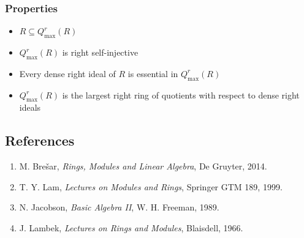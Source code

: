 \documentclass{article}
\begin{document}
	\subsubsection*{Properties}
	\begin{itemize}
		\item $R \subseteq Q^r_{\text{max}}(R)$
		\item $Q^r_{\text{max}}(R)$ is right self-injective
		\item Every dense right ideal of $R$ is essential in $Q^r_{\text{max}}(R)$
		\item $Q^r_{\text{max}}(R)$ is the largest right ring of quotients with respect to dense right ideals
	\end{itemize}
	
	\subsection*{References}
	\begin{enumerate}
		\item M. Bre\v{s}ar, \textit{Rings, Modules and Linear Algebra}, De Gruyter, 2014.
		\item T. Y. Lam, \textit{Lectures on Modules and Rings}, Springer GTM 189, 1999.
		\item N. Jacobson, \textit{Basic Algebra II}, W. H. Freeman, 1989.
		\item J. Lambek, \textit{Lectures on Rings and Modules}, Blaisdell, 1966.
	\end{enumerate}
	
\end{document}
